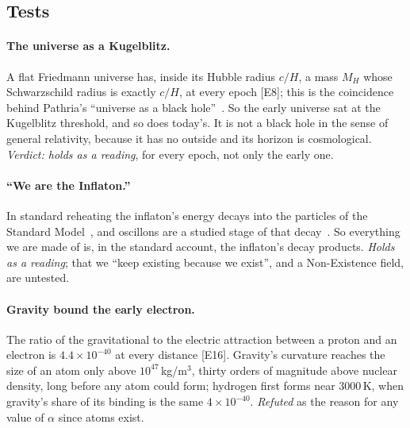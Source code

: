 \documentclass[11pt,a4paper]{article}
\theoremstyle{definition}
\theoremstyle{remark}
\newcommand{\chk}[1]{\textsf{[#1]}}
\begin{document}
\subsection{Tests}

\paragraph{The universe as a Kugelblitz.} A flat Friedmann universe has, inside its Hubble radius $c/H$, a mass $M_H$ whose
Schwarzschild radius is exactly $c/H$, at every epoch \chk{E8}; this is the coincidence behind Pathria's ``universe as a black
hole''~\cite{pathria}. So the early universe sat at the Kugelblitz threshold, and so does today's. It is not a black hole in the sense of
general relativity, because it has no outside and its horizon is cosmological. \emph{Verdict: holds as a reading}, for every epoch, not
only the early one.

\paragraph{``We are the Inflaton.''} In standard reheating the inflaton's energy decays into the particles of the Standard Model~\cite{kls},
and oscillons are a studied stage of that decay~\cite{oscillons}. So everything we are made of is, in the standard account, the inflaton's
decay products. \emph{Holds as a reading}; that we ``keep existing because we exist'', and a Non-Existence field, are untested.

\paragraph{Gravity bound the early electron.} The ratio of the gravitational to the electric attraction between a proton and an electron
is $4.4\times10^{-40}$ at every distance \chk{E16}. Gravity's curvature reaches the size of an atom only above $10^{47}$\,kg/m$^3$, thirty
orders of magnitude above nuclear density, long before any atom could form; hydrogen first forms near 3000\,K, when gravity's share of its
binding is the same $4\times10^{-40}$. \emph{Refuted} as the reason for any value of $\alpha$ since atoms exist.
\end{document}
